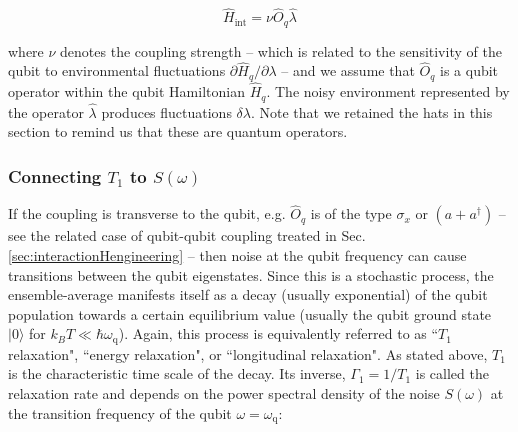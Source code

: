 \documentclass[aip,apr,twocolumn,showpacs,superscriptaddress,groupedaddress,nofootinbib,reprint]{revtex4-1}  %
\newcommand{\freq}{\omega_\text{q}}
\begin{document}
\begin{equation}
\hat{H}_{\text{int}} = \nu \hat{O}_q\hat{\lambda} %
\label{Eq:HintNoise}
\end{equation}

\noindent where $\nu$ denotes the coupling strength -- which is related to the sensitivity of the qubit to environmental fluctuations $\partial\hat{H}_q / \partial\lambda$
-- and we assume that $\hat{O}_q$ is a qubit operator %
within the qubit Hamiltonian $\hat{H}_q$. The noisy environment represented by the operator $\hat{\lambda}$ produces fluctuations $\delta \lambda$. Note that we retained the hats in this section to remind us that these are quantum operators.

\subsubsection{Connecting $T_1$ to $S(\omega)$}
If the coupling is transverse to the qubit, e.g. $\hat{O}_q$ is of the type $\sigma_{x}$ or $(a + a^{\dagger})$ -- see the related case of qubit-qubit coupling treated in Sec. \ref{sec:interactionHengineering} -- then noise at the qubit frequency can cause transitions between the qubit eigenstates. Since this is a stochastic process, the ensemble-average manifests itself as a decay (usually exponential) of the qubit population %
towards a certain equilibrium value (usually the qubit ground state $|0\rangle$ for $k_B T \ll \hbar \freq$). Again, this process is equivalently referred to as ``$T_1$ relaxation", ``energy relaxation", or ``longitudinal relaxation". As stated above, $T_1$ is the characteristic time scale of the decay. Its inverse, $\Gamma_1 = 1/T_{1}$ is called the relaxation rate and depends on the power spectral density of the noise $S(\omega)$ at the transition frequency of the qubit $\omega = \freq$:

\end{document}
